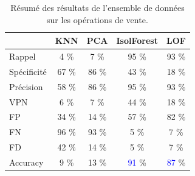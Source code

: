 \begin{table}[H]
\centering
 \begin{tabular}{||l c c c c||} 
 \hline
 &  KNN & PCA & IsolForest & LOF\\ [0.5ex] 
 \hline\hline
Rappel & 4 \% & 7 \%  & 95 \% & 93  \% \\ 
Spécificité & 67 \% & 86 \%  & 43 \% & 18 \% \\
Précision & 58 \% & 86 \%  & 95 \% & 93 \% \\
VPN & 6 \% & 7 \%  & 44 \% & 18 \% \\
FP & 34 \% & 14 \%  & 57 \% & 82 \% \\
FN & 96 \% & 93 \%  & 5 \% & 7 \% \\
FD & 42 \% & 14 \%  & 5 \% & 7 \% \\
Accuracy & 9 \% & 13 \%  & \textcolor{blue}{91} \% & \textcolor{blue}{87} \% \\
[1ex] 
 \hline
 \end{tabular}
 \caption{Résumé des résultats de l'ensemble de données sur les opérations de vente.}
 \label{fig_sale3}
\end{table}

